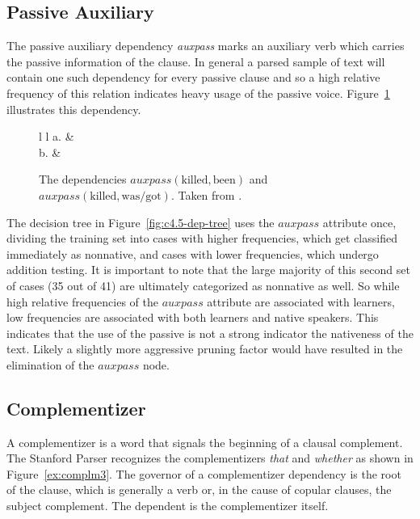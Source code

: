 \documentclass[main.tex]{subfiles}
\begin{document}
\subsection{Passive Auxiliary}

The passive auxiliary dependency \textit{auxpass} marks an auxiliary verb which carries the passive information of the clause. In general a parsed sample of text will contain one such dependency for every passive clause and so a high relative frequency of this relation indicates heavy usage of the passive voice. Figure~\ref{ex:auxpass-dep} illustrates this dependency.

\begin{figure}
\centering
\begin{tabular}{ l l }
a. & \\
b. & 
\end{tabular}
\caption{The dependencies $auxpass(\text{killed},\text{been})$ and $auxpass(\text{killed},\text{was/got})$. Taken from \citet{typed-deps-manual}.}
\label{ex:auxpass-dep}
\end{figure}

The decision tree in Figure~\ref{fig:c4.5-dep-tree} uses the $auxpass$ attribute once, dividing the training set into cases with higher frequencies, which get classified immediately as nonnative, and cases with lower frequencies, which undergo addition testing. It is important to note that the large majority of this second set of cases (35 out of 41) are ultimately categorized as nonnative as well. So while high relative frequencies of the $auxpass$ attribute are associated with learners, low frequencies are associated with both learners and native speakers. This indicates that the use of the passive is not a strong indicator the nativeness of the text. Likely a slightly more aggressive pruning factor would have resulted in the elimination of the $auxpass$ node.

\subsection{Complementizer}

A complementizer is a word that signals the beginning of a clausal complement. The Stanford Parser recognizes the complementizers \textit{that} and \textit{whether} as shown in Figure~\ref{ex:complm3}. The governor of a complementizer dependency is the root of the clause, which is generally a verb or, in the cause of copular clauses, the subject complement. The dependent is the complementizer itself.
\end{document}
